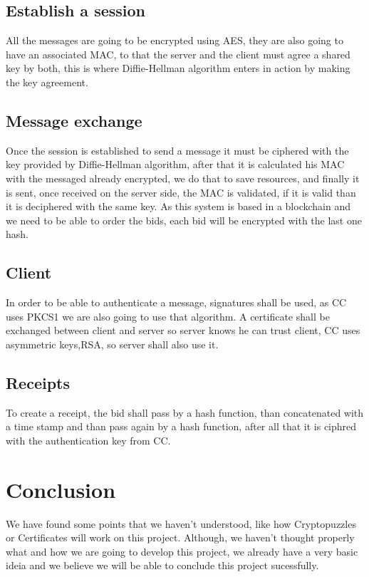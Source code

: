 \documentclass[pdftex,12pt,a4paper]{report}
\begin{document}
\vskip 1cm
\subsection{Establish a session}
All the messages are going to be encrypted using AES, they are also going to have an associated MAC, to that the server and the client must agree a shared key by both, this is where Diffie-Hellman algorithm enters in action by making the key agreement.

\vskip 1.5cm
\subsection{Message exchange}
Once the session is established to send a message it must be ciphered with the key provided by Diffie-Hellman algorithm, after that it is calculated his MAC with the messaged already encrypted, we do that to save resources, and finally it is sent, once received on the server side, the MAC is validated, if it is valid than it is deciphered with the same key.
As this system is based in a blockchain and we need to be able to order the bids, each bid will be encrypted with the last one hash.

\vskip 1.5cm
\subsection{Client}
In order to be able to authenticate a message, signatures shall be used, as CC uses PKCS1 we are also going to use that algorithm.
A certificate shall be exchanged between client and server so server knows he can trust client, CC uses asymmetric keys,RSA, so server shall also use it.

\vskip 1.5cm
\subsection{Receipts}
To create a receipt, the bid shall pass by a hash function, than concatenated with a time stamp and than pass again by a hash function, after all that it is ciphred with the authentication key from CC.


\newpage
\section{Conclusion}
We have found some points that we haven't understood, like how Cryptopuzzles or Certificates will work on this project.
Although, we haven't thought properly what and how we are going to develop this project, we already have a very basic ideia and we believe we will be able to conclude this project sucessfully.
\end{document}

